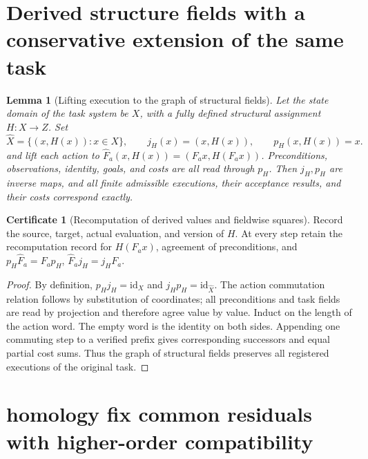 \documentclass[12pt,a4paper,openany,notitlepage]{report}
\theoremstyle{plain}
\newtheorem{lemma}[theorem]{Lemma}
\theoremstyle{definition}
\newtheorem*{certificate}{Certificate}
\theoremstyle{remark}
\begin{document}
\begin{CJK*}
\section { Derived structure fields with a conservative extension of the same task }

\begin{lemma} [Lifting execution to the graph of structural fields]
\label{exp:joint:derived-fields}
Let the state domain of the task system be $X$, with a fully defined structural assignment $H:X\to Z$. Set
\[
 \widehat X=\{(x,H(x)):x\in X\},\qquad
 j_H(x)=(x,H(x)),\qquad p_H(x,H(x))=x.
\]
and lift each action to
$\widehat F_a(x,H(x))=(F_a x,H(F_a x))$.
Preconditions, observations, identity, goals, and costs are all read through $p_H$. Then $j_H,p_H$ are inverse maps, and all finite admissible executions, their acceptance results, and their costs correspond exactly.
\end{lemma}
\begin{certificate} [Recomputation of derived values and fieldwise squares]
Record the source, target, actual evaluation, and version of $H$. At every step retain the recomputation record for $H(F_ax)$, agreement of preconditions, and
$p_H\widehat F_a=F_ap_H$, $\widehat F_aj_H=j_HF_a$.
\end{certificate}
\begin{proof}
By definition, $p_Hj_H=\mathrm{id}_X$ and $j_Hp_H=\mathrm{id}_{\widehat X}$. The action commutation relation follows by substitution of coordinates; all preconditions and task fields are read by projection and therefore agree value by value. Induct on the length of the action word. The empty word is the identity on both sides. Appending one commuting step to a verified prefix gives corresponding successors and equal partial cost sums. Thus the graph of structural fields preserves all registered executions of the original task.
\end{proof}

\section { homology fix common residuals with higher-order compatibility }


\end{CJK*}
\end{document}
